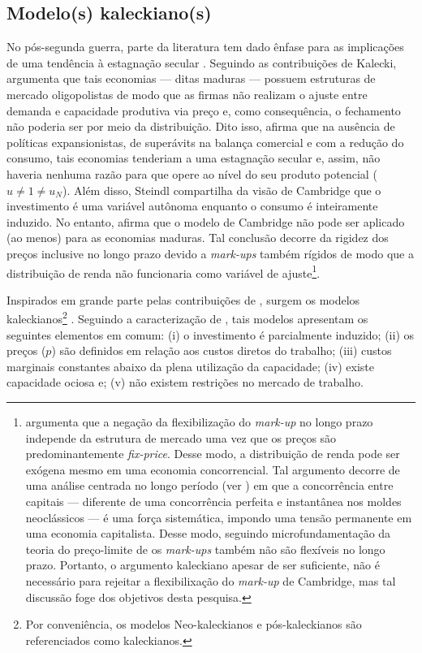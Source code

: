 \subsection{Modelo(s) kaleckiano(s)}

No pós-segunda guerra, parte da literatura tem dado ênfase para 
as implicações de uma tendência à estagnação secular \cite{setterfield_distribution_2002}.
Seguindo as contribuições de Kalecki, \textcite{steindl_maturity_1952} argumenta que tais economias --- ditas maduras --- possuem estruturas de mercado oligopolistas de modo que as firmas não realizam o ajuste entre demanda e capacidade produtiva via preço e, como consequência, o fechamento não poderia ser por meio da distribuição.
Dito isso, \textcite{steindl_stagnation_1979} afirma que na ausência de políticas expansionistas, de superávits na balança comercial e com a redução do consumo,  tais economias tenderiam a uma estagnação secular e, assim,  não haveria nenhuma razão para que opere ao nível do seu produto potencial ($u\neq 1 \neq u_N$). 
Além disso, Steindl compartilha da visão de Cambridge que o investimento é uma variável autônoma enquanto o consumo é inteiramente induzido. 
No entanto, afirma que o modelo de Cambridge não pode ser aplicado (ao menos) para as economias maduras.  
Tal conclusão decorre da rigidez dos preços inclusive no longo prazo devido a \textit{mark-ups} também rígidos de modo que a distribuição de renda não funcionaria como variável de ajuste\footnote{
	\textcite{serrano_sraffian_1995} argumenta que a negação da flexibilização do \textit{mark-up} no longo prazo independe da estrutura de mercado uma vez que os preços são predominantemente \textit{fix-price}. Desse modo, a distribuição de renda pode ser exógena mesmo em uma economia concorrencial. Tal argumento decorre de uma análise centrada no longo período (ver \textcite{milgate_capital_1982}) em que a concorrência entre capitais --- diferente de uma concorrência perfeita e instantânea nos moldes neoclássicos ---  é uma força sistemática, impondo uma tensão permanente em uma economia capitalista. 
	Desse modo, seguindo microfundamentação da teoria do preço-limite de \textcite{labini} os \textit{mark-ups} também não são flexíveis no longo prazo.
	Portanto, o argumento kaleckiano apesar de ser suficiente,  não é necessário para  rejeitar a flexibilixação do \textit{mark-up} de Cambridge, mas tal discussão foge dos objetivos desta pesquisa.
}.

Inspirados em grande parte pelas contribuições de \textcite{steindl_stagnation_1979}, surgem os modelos kaleckianos\footnote{Por conveniência, os modelos Neo-kaleckianos e pós-kaleckianos são referenciados como kaleckianos.} \cites{rowthorn_demand_1981}{dutt_stagnation_1984}{taylor_stagnationist_1985}{amadeo_role_1986}{bhaduri_unemployment_1990}. Seguindo a caracterização de \textcite[p.~790]{lavoie_kaleckian_1995}, tais modelos apresentam os seguintes elementos em comum: (i) o investimento é parcialmente induzido; (ii) os preços ($p$) são definidos em relação aos custos diretos do trabalho; (iii) custos marginais constantes abaixo da plena utilização da capacidade; (iv) existe capacidade ociosa e; (v) não existem restrições no mercado de trabalho. 

